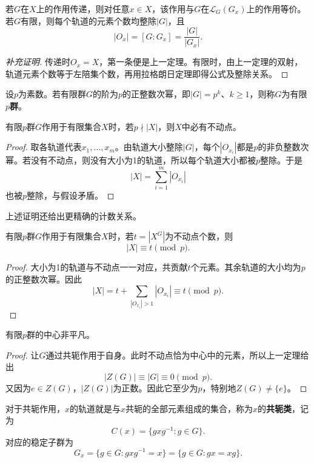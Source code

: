 \begin{corollary}
若$G$在$X$上的作用传递，则对任意$x\in X$，该作用与$G$在$\mathcal L_G(G_x)$上的作用等价。
若$G$有限，则每个轨道的元素个数均整除$|G|$，且
\[
|O_x|=[G:G_x]=\frac{|G|}{|G_x|}.
\]
\end{corollary}
\begin{proof}[补充证明]
传递时$O_x=X$，第一条便是上一定理。有限时，由上一定理的双射，轨道元素个数等于左陪集个数，再用拉格朗日定理即得公式及整除关系。
\end{proof}

\begin{definition}
设$p$为素数。若有限群$G$的阶为$p$的正整数次幂，即$|G|=p^k$、$k\geq1$，则称$G$为有限\textbf{$p$群}。
\end{definition}

\begin{corollary}
有限$p$群$G$作用于有限集合$X$时，若$p\nmid|X|$，则$X$中必有不动点。
\end{corollary}
\begin{proof}
取各轨道代表$x_1,\ldots,x_m$。由轨道大小整除$|G|$，每个$|O_{x_i}|$都是$p$的非负整数次幂。若没有不动点，则没有大小为1的轨道，所以每个轨道大小都被$p$整除。于是
\[
|X|=\sum_{i=1}^m|O_{x_i}|
\]
也被$p$整除，与假设矛盾。
\end{proof}

上述证明还给出更精确的计数关系。

\begin{theorem}\label{p2:p-fixed}
有限$p$群$G$作用于有限集合$X$时，若$t=|X^G|$为不动点个数，则
\[
|X|\equiv t\pmod p.
\]
\end{theorem}
\begin{proof}
大小为1的轨道与不动点一一对应，共贡献$t$个元素。其余轨道的大小均为$p$的正整数次幂。因此
\[
|X|=t+\sum_{|O_{x_i}|>1}|O_{x_i}|\equiv t\pmod p.
\]
\end{proof}

\begin{corollary}
有限$p$群的中心非平凡。
\end{corollary}
\begin{proof}
让$G$通过共轭作用于自身。此时不动点恰为中心中的元素，所以上一定理给出
\[
|Z(G)|\equiv|G|\equiv0\pmod p.
\]
又因为$e\in Z(G)$，$|Z(G)|$为正数。因此它至少为$p$，特别地$Z(G)\ne\{e\}$。
\end{proof}

对于共轭作用，$x$的轨道就是与$x$共轭的全部元素组成的集合，称为$x$的\textbf{共轭类}，记为
\[
C(x)=\{gxg^{-1}:g\in G\}.
\]
对应的稳定子群为
\[
G_x=\{g\in G:gxg^{-1}=x\}
=\{g\in G:gx=xg\}.
\]

